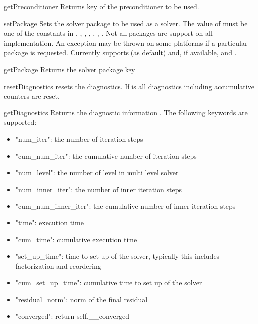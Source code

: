 \begin{methoddesc}[SolverOptions]{getPreconditioner}{}
Returns key of the preconditioner to be used. 
\end{methoddesc}

\begin{methoddesc}[SolverOptions]{setPackage}{}
Sets the solver package to be used as a solver.  
The value of  must be one of the constants in , , , , , , .
Not all packages are support on all implementation. An exception may be thrown on some platforms if a particular package is requested. Currently \finley supports  (as default)
and, if available,  and .
\end{methoddesc}

\begin{methoddesc}[SolverOptions]{getPackage}{}
Returns the solver package key
\end{methoddesc}


\begin{methoddesc}[SolverOptions]{resetDiagnostics}{}
resets the diagnostics. If  is \True all diagnostics including accumulative counters are reset.
\end{methoddesc}

\begin{methoddesc}[SolverOptions]{getDiagnostics}{}
Returns the diagnostic information . The following keywords are
supported:
\begin{itemize}
 \item "num_iter": the number of iteration steps
 \item "cum_num_iter": the cumulative number of iteration steps
 \item "num_level": the number of level in multi level solver
 \item "num_inner_iter": the number of inner iteration steps
 \item"cum_num_inner_iter": the cumulative number of inner iteration steps
 \item"time": execution time 
 \item "cum_time": cumulative execution time
 \item "set_up_time": time to set up of the solver, typically this includes factorization and reordering
 \item "cum_set_up_time": cumulative time to set up of the solver
 \item "residual_norm": norm of the final residual
 \item "converged": return self.__converged     
\end{itemize}
\end{methoddesc}


